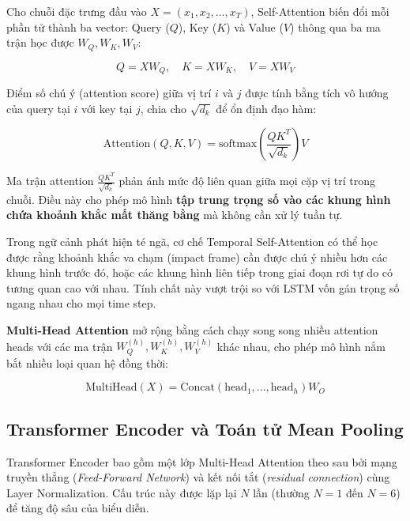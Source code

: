 Cho chuỗi đặc trưng đầu vào $X = (x_1, x_2, ..., x_T)$, Self-Attention biến đổi mỗi phần tử thành ba vector: Query ($Q$), Key ($K$) và Value ($V$) thông qua ba ma trận học được $W_Q, W_K, W_V$:

\begin{equation}
Q = X W_Q, \quad K = X W_K, \quad V = X W_V
\end{equation}

Điểm số chú ý (attention score) giữa vị trí $i$ và $j$ được tính bằng tích vô hướng của query tại $i$ với key tại $j$, chia cho $\sqrt{d_k}$ để ổn định đạo hàm:

\begin{equation}
\text{Attention}(Q, K, V) = \text{softmax}\left(\frac{Q K^T}{\sqrt{d_k}}\right) V
\end{equation}

Ma trận attention $\frac{Q K^T}{\sqrt{d_k}}$ phản ánh mức độ liên quan giữa mọi cặp vị trí trong chuỗi. Điều này cho phép mô hình \textbf{tập trung trọng số vào các khung hình chứa khoảnh khắc mất thăng bằng} mà không cần xử lý tuần tự.

Trong ngữ cảnh phát hiện té ngã, cơ chế Temporal Self-Attention có thể học được rằng khoảnh khắc va chạm (impact frame) cần được chú ý nhiều hơn các khung hình trước đó, hoặc các khung hình liên tiếp trong giai đoạn rơi tự do có tương quan cao với nhau. Tính chất này vượt trội so với LSTM vốn gán trọng số ngang nhau cho mọi time step.

\textbf{Multi-Head Attention} mở rộng bằng cách chạy song song nhiều attention heads với các ma trận $W_Q^{(h)}, W_K^{(h)}, W_V^{(h)}$ khác nhau, cho phép mô hình nắm bắt nhiều loại quan hệ đồng thời:

\begin{equation}
\text{MultiHead}(X) = \text{Concat}(\text{head}_1, ..., \text{head}_h) W_O
\end{equation}

\subsection{Transformer Encoder và Toán tử Mean Pooling}
\label{sec:transformer_encoder_mean_pooling}

Transformer Encoder bao gồm một lớp Multi-Head Attention theo sau bởi mạng truyền thẳng (\textit{Feed-Forward Network}) và kết nối tắt (\textit{residual connection}) cùng Layer Normalization. Cấu trúc này được lặp lại $N$ lần (thường $N=1$ đến $N=6$) để tăng độ sâu của biểu diễn.

